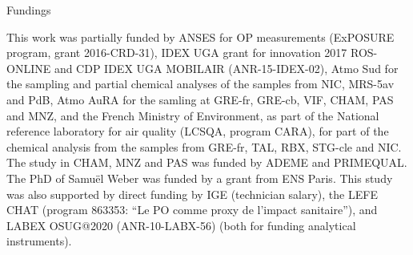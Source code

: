 \documentclass[acp]{copernicus}
\begin{document}
Fundings

This work was partially funded by ANSES for OP measurements (ExPOSURE
program, grant 2016-CRD-31), IDEX UGA grant for innovation 2017
ROS-ONLINE and CDP IDEX UGA MOBILAIR (ANR-15-IDEX-02), Atmo Sud for the
sampling and partial chemical analyses of the samples from NIC, MRS-5av and PdB, Atmo AuRA
for the samling at GRE-fr, GRE-cb, VIF, CHAM,
PAS and MNZ, and the French Ministry of Environment, as part of the
National reference laboratory for air quality (LCSQA, program CARA), for part of the
chemical analysis from the samples
from GRE-fr, TAL, RBX, STG-cle and NIC. The study in CHAM, MNZ and PAS was funded by
ADEME and PRIMEQUAL. The PhD of Samuël Weber was funded by a grant from ENS Paris.
This study was also supported by direct funding by IGE (technician
salary), the LEFE CHAT (program 863353: ``Le PO comme proxy de l'impact
sanitaire''), and LABEX OSUG@2020 (ANR-10-LABX-56) (both for funding
analytical instruments).




\dataavailability{} %








%
%
\end{document}
